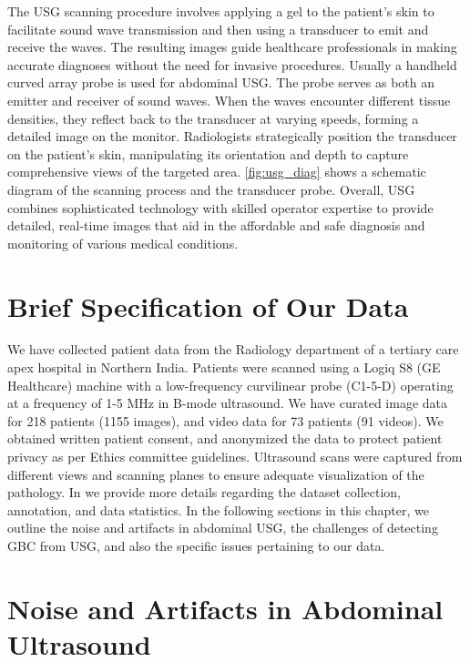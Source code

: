 \par The USG scanning procedure involves applying a gel to the patient's skin to facilitate sound wave transmission and then using a transducer to emit and receive the waves. The resulting images guide healthcare professionals in making accurate diagnoses without the need for invasive procedures. Usually a handheld curved array probe is used for abdominal USG. The probe serves as both an emitter and receiver of sound waves. When the waves encounter different tissue densities, they reflect back to the transducer at varying speeds, forming a detailed image on the monitor. Radiologists strategically position the transducer on the patient's skin, manipulating its orientation and depth to capture comprehensive views of the targeted area. \cref{fig:usg_diag} shows a schematic diagram of the scanning process and the transducer probe.
Overall, USG combines sophisticated technology with skilled operator expertise to provide detailed, real-time images that aid in the affordable and safe diagnosis and monitoring of various medical conditions.

\section{Brief Specification of Our Data}
%
We have collected patient data from the Radiology department of a tertiary care apex hospital in Northern India. Patients were scanned using a Logiq S8 (GE Healthcare) machine with a low-frequency curvilinear probe (C1-5-D) operating at a frequency of 1-5 MHz in B-mode ultrasound. We have curated image data for 218 patients (1155 images), and video data for 73 patients (91 videos). We obtained written patient consent, and anonymized the data to protect patient privacy as per Ethics committee guidelines. Ultrasound scans were captured from different views and scanning planes to ensure adequate visualization of the pathology. 
In  we provide more details regarding the dataset collection, annotation, and data statistics. In the following sections in this chapter, we outline the noise and artifacts in abdominal USG, the challenges of detecting GBC from USG, and also the specific issues pertaining to our data.

%
\section{Noise and Artifacts in Abdominal Ultrasound}
\label{sec:artifact_in_usg}

